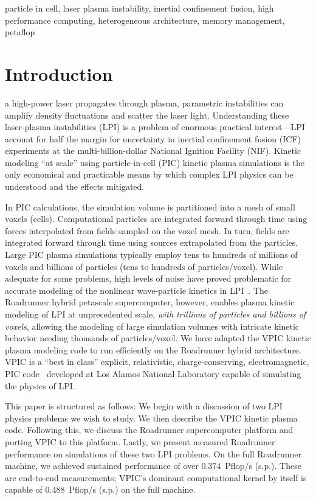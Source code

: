 \documentclass[journal,twoside]{IEEEtran}
\begin{document}
\begin{IEEEkeywords}
particle in cell,
laser plasma instability,
inertial confinement fusion,
high performance computing,
heterogeneous architecture,
memory management,
petaflop
\end{IEEEkeywords}

\section{Introduction}

 a high-power laser propagates through plasma,
parametric instabilities can amplify density fluctuations and scatter
the laser light.  Understanding these laser-plasma instabilities (LPI)
is a problem of enormous practical interest---LPI account for half the
margin for uncertainty in inertial confinement fusion (ICF)
experiments at the multi-billion-dollar National Ignition Facility
(NIF).  Kinetic modeling ``at scale'' using particle-in-cell (PIC)
kinetic plasma simulations is the only economical and practicable
means by which complex LPI physics can be understood and the effects
mitigated.

In PIC calculations, the simulation volume is partitioned into a mesh
of small voxels (cells).  Computational particles are integrated
forward through time using forces interpolated from fields sampled on
the voxel mesh.  In turn, fields are integrated forward through time
using sources extrapolated from the particles.  Large PIC plasma
simulations typically employ tens to hundreds of millions of voxels
and billions of particles (tens to hundreds of particles/voxel).
While adequate for some problems, high levels of noise have proved
problematic for accurate modeling of the nonlinear wave-particle
kinetics in LPI~\cite{Yin_et_al_Phys_Plasmas_2006}.  The Roadrunner
hybrid petascale supercomputer, however, enables plasma kinetic
modeling of LPI at unprecedented scale, \textit{with trillions of
particles and billions of voxels}, allowing the modeling of large
simulation volumes with intricate kinetic behavior needing thousands
of particles/voxel.  We have adapted the VPIC kinetic plasma modeling
code to run efficiently on the Roadrunner hybrid architecture.  VPIC
is a ``best in class'' explicit, relativistic, charge-conserving,
electromagnetic, PIC code~\cite{Bowers_et_al_Phys_Plasmas_2007}
developed at Los Alamos National Laboratory capable of simulating the
physics of LPI.

This paper is structured as follows: We begin with a discussion of two
LPI physics problems we wish to study.  We then describe the VPIC
kinetic plasma code.  Following this, we discuss the Roadrunner
supercomputer platform and porting VPIC to this platform.  Lastly, we
present measured Roadrunner performance on simulations of these two
LPI problems.  On the full Roadrunner machine, we achieved sustained
performance of over $0.374$~Pflop/s (s.p.).  These are end-to-end
measurements; VPIC's dominant computational kernel by itself is
capable of $0.488$~Pflop/s (s.p.) on the full machine.
\end{document}
